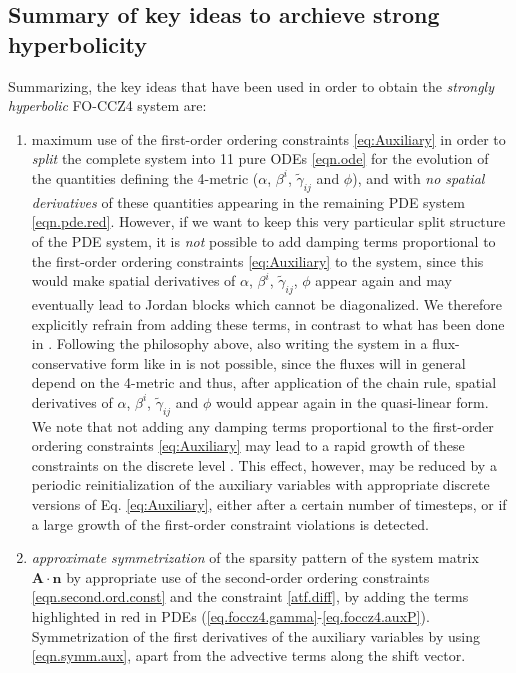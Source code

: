 \subsection*{Summary of key ideas to archieve strong hyperbolicity}
Summarizing, the key ideas that have been used in order to obtain the
\emph{strongly hyperbolic} FO-CCZ4 system are:

\begin{enumerate}
 \item maximum use of the first-order ordering constraints
   \eqref{eq:Auxiliary} in order to \textit{split} the complete system
   into 11 pure ODEs \eqref{eqn.ode} for the evolution of the quantities
   defining the 4-metric ($\alpha$, $\beta^i$, $\tilde{\gamma}_{ij}$ and
   $\phi$), and with \textit{no spatial derivatives} of these quantities
   appearing in the remaining PDE system \eqref{eqn.pde.red}. However, if
   we want to keep this very particular split structure of the PDE
   system, it is \textit{not} possible to add damping terms proportional
   to the first-order ordering constraints \eqref{eq:Auxiliary} to the
   system, since this would make spatial derivatives of $\alpha$,
   $\beta^i$, $\tilde{\gamma}_{ij}$, $\phi$ appear again and may
   eventually lead to Jordan blocks which cannot be diagonalized. We
   therefore explicitly refrain from adding these terms, in contrast to
   what has been done in \cite{Brown2012}. Following the philosophy
   above, also writing the system in a flux-conservative form like in
   \cite{Bona97a,Alic:2009} is not possible, since the fluxes will in
   general depend on the 4-metric and thus, after application of the
   chain rule, spatial derivatives of $\alpha$, $\beta^i$,
   $\tilde{\gamma}_{ij}$ and $\phi$ would appear again in the
   quasi-linear form. We note that not adding any damping terms
   proportional to the first-order ordering constraints
   \eqref{eq:Auxiliary} may lead to a rapid growth of these constraints
   on the discrete level \cite{Lindblom:2005gh}. This effect,
   however, may be reduced by a periodic reinitialization of the
   auxiliary variables with appropriate discrete versions of
   Eq. \eqref{eq:Auxiliary}, either after a certain number of timesteps,
   or if a large growth of the first-order constraint violations is
   detected.

 \item \textit{approximate symmetrization} of the sparsity pattern of the
   system matrix $\boldsymbol{A} \cdot \boldsymbol{n}$ by appropriate use
   of the second-order ordering constraints \eqref{eqn.second.ord.const}
   and the constraint \eqref{atf.diff}, \ie by adding the terms
   highlighted in red in PDEs (\ref{eq.foccz4.gamma}-\ref{eq.foccz4.auxP}).
   Symmetrization of the first derivatives of the auxiliary variables by
   using \eqref{eqn.symm.aux}, apart from the advective terms along the
   shift vector.


\end{enumerate}
